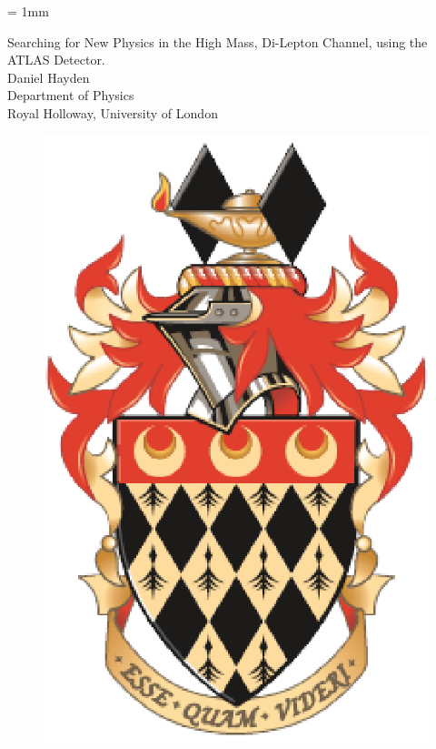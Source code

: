 \documentclass[11pt,a4paper]{report} %
\begin{document}
\unitlength = 1mm
\begin{titlepage}
\begin{center}
{\LARGE Searching for New Physics in the High Mass, Di-Lepton Channel, using the ATLAS Detector.\\}
\vspace{2cm}
{\Large Daniel Hayden\\}
\vspace{1cm}
{\large Department of Physics\\}
{\large Royal Holloway, University of London\\}

\end{center}
\vspace{1cm}

\begin{figure}[ht]
\begin{center}
\includegraphics[scale=0.2]{images/rhulcrestsmall.eps}
\end{center}
\end{figure}


\end{titlepage}
\end{document}
